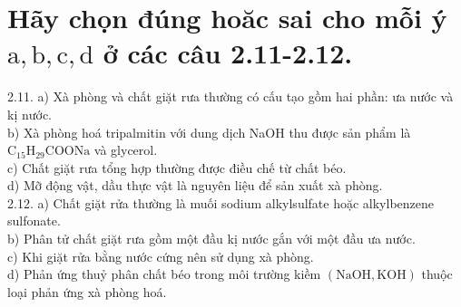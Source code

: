 \documentclass[10pt]{article}
\begin{document}
\section*{Hãy chọn đúng hoăc sai cho mỗi ý $\mathrm{a}, \mathrm{b}, \mathrm{c}, \mathrm{d}$ ở các câu 2.11-2.12.}
2.11. a) Xà phòng và chất giặt rưa thường có cấu tạo gồm hai phần: ưa nước và kị nước.\\
b) Xà phòng hoá tripalmitin với dung dịch NaOH thu được sản phẩm là $\mathrm{C}_{15} \mathrm{H}_{29} \mathrm{COONa}$ và glycerol.\\
c) Chất giặt rưa tổng hợp thường được điều chế từ chất béo.\\
d) Mỡ động vật, dầu thực vật là nguyên liệu để sản xuất xà phòng.\\
2.12. a) Chất giặt rửa thường là muối sodium alkylsulfate hoặc alkylbenzene sulfonate.\\
b) Phân tử chất giặt rưa gồm một đầu kị nước gắn với một đầu ưa nước.\\
c) Khi giặt rửa bằng nước cứng nên sử dụng xà phòng.\\
d) Phản ứng thuỷ phân chất béo trong môi trường kiềm $(\mathrm{NaOH}, \mathrm{KOH})$ thuộc loại phản ứng xà phòng hoá.
\end{document}
